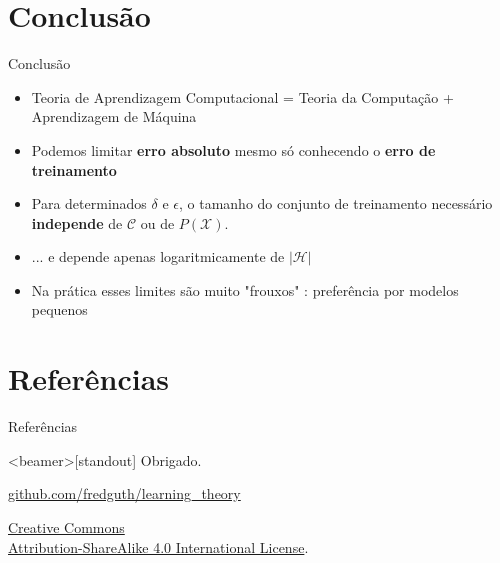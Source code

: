 \documentclass[10pt, professionalfonts]{beamer}
\begin{document}
{

  \AtBeginSection{}
\section{Conclusão}
\begin{frame}{Conclusão}
  \begin{itemize}[<+->]
    \item Teoria de Aprendizagem Computacional = Teoria da Computação + Aprendizagem de Máquina
    \item Podemos limitar \textbf{erro absoluto} mesmo só conhecendo o \textbf{erro de treinamento}
    \item Para determinados $\delta$ e $\epsilon$, o tamanho do conjunto de treinamento necessário \textbf{independe} de $\mathcal{C}$ ou  de $P(\mathcal{X})$.
    \item ... e depende apenas logaritmicamente de $|\mathcal{H}|$
    \item Na prática esses limites são muito "frouxos" \cite{MitchelPAC}: preferência por modelos pequenos
    \end{itemize}
\end{frame}
}
{

  \AtBeginSection{}
\section{Referências}
\begin{frame}[allowframebreaks]{Referências}

  
  

\end{frame}
}
\begin{frame}<beamer>[standout]
  Obrigado.
  \vspace*{.5cm}
\begin{center}\href{https://github.com/fredguth/learning_theory.git}{\url{github.com/fredguth/learning_theory}}\end{center}
  \vspace*{.5cm}
  \small{
    \begin{center}\ccbysa\end{center}
    \href{http://creativecommons.org/licenses/by-sa/4.0/}{Creative Commons \\
      Attribution-ShareAlike 4.0 International License}.
  }
\end{frame}




\end{document}
